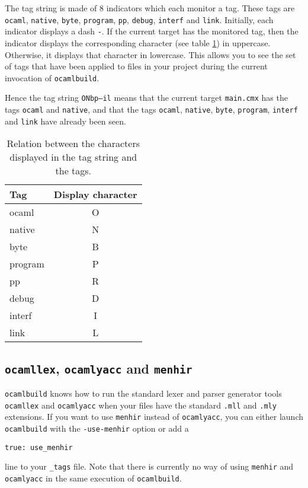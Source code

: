\documentclass[9pt]{article}
\newcommand{\ocb}{\texttt{ocamlbuild}\xspace}
\newcommand{\tags}{\texttt{\_tags}\xspace}
\begin{document}
The tag string is made of 8 indicators which each monitor a tag. These tags
are \texttt{ocaml}, \texttt{native}, \texttt{byte}, \texttt{program},
\texttt{pp}, \texttt{debug}, \texttt{interf} and \texttt{link}.  Initially,
each indicator displays a dash \texttt{-}.  If the current target has the
monitored tag, then the indicator displays the corresponding character
(see table \ref{tab:tag-chars}) in uppercase.  Otherwise, it displays that
character in lowercase.  This allows you to see the set of tags that have
been applied to files in your project during the current invocation of \ocb.

Hence the tag string \texttt{ONbp--il} means that the current target
\texttt{main.cmx} has the tags \texttt{ocaml} and \texttt{native}, and that
the tags \texttt{ocaml}, \texttt{native}, \texttt{byte}, \texttt{program},
\texttt{interf} and \texttt{link} have already been seen.

\begin{table}
  \begin{center}
    \begin{tabular}{|l|c|}
       \hline
       \textbf{Tag} & \textbf{Display character} \\
       \hline
       \hline
       ocaml	& O \\
       \hline
       native	& N \\
       \hline
       byte	& B \\
       \hline
       program	& P \\
       \hline
       pp	        & R \\
       \hline
       debug	& D \\
       \hline
       interf	& I \\
       \hline
       link	& L \\
       \hline
    \end{tabular}
  \end{center}
  \caption{\label{tab:tag-chars} Relation between the characters displayed in
    the tag string and the tags.}
\end{table}
\subsection{\texttt{ocamllex}, \texttt{ocamlyacc} and \texttt{menhir}}
\ocb knows how to run the standard lexer and parser generator tools
\texttt{ocamllex} and \texttt{ocamlyacc} when your files have the
standard \texttt{.mll} and \texttt{.mly} extensions.  If you want to
use \texttt{menhir} instead of \texttt{ocamlyacc}, you can either
launch \ocb with the \texttt{-use-menhir} option or add a
\begin{verbatim}
true: use_menhir
\end{verbatim}
line to your \tags file.  Note that there is currently no way
of using \texttt{menhir} and \texttt{ocamlyacc} in the same execution
of \ocb.
\end{document}
